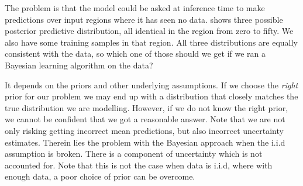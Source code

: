 The problem is that the model could be asked at inference time to make predictions over input regions where it has seen no data.  shows three possible posterior predictive distribution, all identical in the region from zero to fifty. We also have some training samples in that region. All three distributions are equally consistent with the data, so which one of those should we get if we ran a Bayesian learning algorithm on the data?

It depends on the priors and other underlying assumptions. If we choose the \emph{right} prior for our problem we may end up with a distribution that closely matches the true distribution we are modelling. However, if we do not know the right prior, we cannot be confident that we got a reasonable answer. Note that we are not only risking getting incorrect mean predictions, but also incorrect uncertainty estimates. Therein lies the problem with the Bayesian approach when the i.i.d assumption is broken. There is a component of uncertainty which is not accounted for. Note that this is not the case when data is i.i.d, where with enough data, a poor choice of prior can be overcome. 


    
    
    
    

